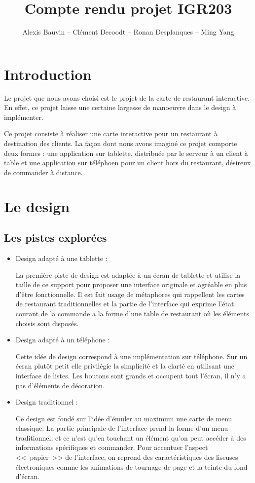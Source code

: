 \documentclass[a4paper,12pt]{article}
\title{Compte rendu projet IGR203}
\author{Alexis Bauvin -- Clément Decoodt -- Ronan Desplanques -- Ming Yang}
\begin{document}
\maketitle

\tableofcontents

\section*{Introduction}

Le projet que nous avons choisi est le projet de la carte de restaurant interactive. En effet, ce projet laisse une
certaine largesse de manoeuvre dans le design à implémenter.

Ce projet consiste à réaliser une carte interactive pour un restaurant à destination des clients. La façon dont nous
avons imaginé ce projet comporte deux formes : une application sur tablette, distribuée par le serveur à un client à
table et une application sur téléphoen pour un client hors du restaurant, désireux de commander à distance.

\newpage

\section{Le design}

\subsection{Les pistes explorées}

\begin{itemize}
\item Design adapté à une tablette :

La première piste de design est adaptée à un écran de tablette et utilise la taille de ce support pour proposer
une interface originale et agréable en plus d'être fonctionnelle. Il est fait usage de métaphores qui rappellent
les cartes de restaurant traditionnelles et la partie de l'interface qui exprime l'état courant de la commande
a la forme d'une table de restaurant où les éléments choisis sont disposés.

\item Design adapté à un téléphone :

Cette idée de design correspond à une implémentation sur téléphone. Sur un écran plutôt petit elle privilégie la
simplicité et la clarté en utilisant une interface de listes. Les boutons sont grands et occupent tout l'écran,
il n'y a pas d'éléments de décoration.

\item Design traditionnel :

Ce design est fondé sur l'idée d'émuler au maximum une carte de menu classique. La partie principale de l'interface
prend la forme d'un menu traditionnel, et ce n'est qu'en touchant un élément qu'on peut accéder à des informations
spécifiques et commander. Pour accentuer l'aspect <<~papier~>> de l'interface, on reprend des caractéristiques des
liseuses électroniques comme les animations de tournage de page et la teinte du fond d'écran.

\end{itemize}
\end{document}
